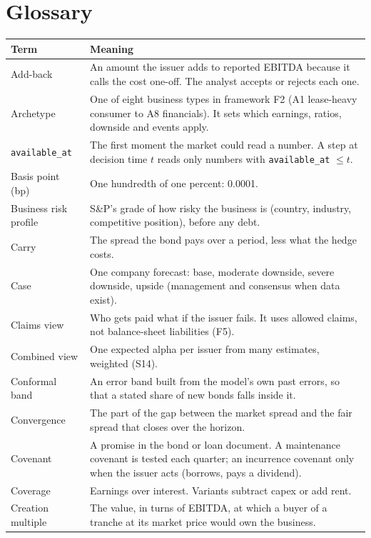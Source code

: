 \documentclass[11pt]{article}
\begin{document}
\section{Glossary}\label{sec:glossary}

{\footnotesize
\begin{xltabular}{\linewidth}{@{}>{\raggedright\arraybackslash}p{36mm}X@{}}
\toprule
Term & Meaning \\
\midrule
\endhead
Add-back & An amount the issuer adds to reported EBITDA because it calls the cost one-off. The analyst accepts or rejects each one. \\
Archetype & One of eight business types in framework F2 (A1 lease-heavy consumer to A8 financials). It sets which earnings, ratios, downside and events apply. \\
\texttt{available\_at} & The first moment the market could read a number. A step at decision time $t$ reads only numbers with \texttt{available\_at} $\le t$. \\
Basis point (bp) & One hundredth of one percent: 0.0001. \\
Business risk profile & S\&P's grade of how risky the business is (country, industry, competitive position), before any debt. \\
Carry & The spread the bond pays over a period, less what the hedge costs. \\
Case & One company forecast: base, moderate downside, severe downside, upside (management and consensus when data exist). \\
Claims view & Who gets paid what if the issuer fails. It uses allowed claims, not balance-sheet liabilities (F5). \\
Combined view & One expected alpha per issuer from many estimates, weighted (S14). \\
Conformal band & An error band built from the model's own past errors, so that a stated share of new bonds falls inside it. \\
Convergence & The part of the gap between the market spread and the fair spread that closes over the horizon. \\
Covenant & A promise in the bond or loan document. A maintenance covenant is tested each quarter; an incurrence covenant only when the issuer acts (borrows, pays a dividend). \\
Coverage & Earnings over interest. Variants subtract capex or add rent. \\
Creation multiple & The value, in turns of EBITDA, at which a buyer of a tranche at its market price would own the business. \\

\end{xltabular}}
\end{document}
